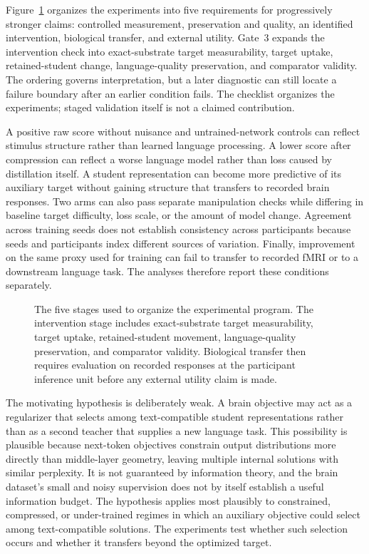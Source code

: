 Figure~\ref{fig:five-gates} organizes the experiments into five requirements for progressively stronger claims: controlled measurement, preservation and quality, an identified intervention, biological transfer, and external utility.
Gate~3 expands the intervention check into exact-substrate target measurability, target uptake, retained-student change, language-quality preservation, and comparator validity.
The ordering governs interpretation, but a later diagnostic can still locate a failure boundary after an earlier condition fails.
The checklist organizes the experiments; staged validation itself is not a claimed contribution.

A positive raw score without nuisance and untrained-network controls can reflect stimulus structure rather than learned language processing.
A lower score after compression can reflect a worse language model rather than loss caused by distillation itself.
A student representation can become more predictive of its auxiliary target without gaining structure that transfers to recorded brain responses.
Two arms can also pass separate manipulation checks while differing in baseline target difficulty, loss scale, or the amount of model change.
Agreement across training seeds does not establish consistency across participants because seeds and participants index different sources of variation.
Finally, improvement on the same proxy used for training can fail to transfer to recorded fMRI or to a downstream language task.
The analyses therefore report these conditions separately.

\enlargethispage{\baselineskip}
\begin{figure}[H]
  \centering
  
  \caption{The five stages used to organize the experimental program. The intervention stage includes exact-substrate target measurability, target uptake, retained-student movement, language-quality preservation, and comparator validity. Biological transfer then requires evaluation on recorded responses at the participant inference unit before any external utility claim is made.}
  \label{fig:five-gates}
\end{figure}

The motivating hypothesis is deliberately weak.
A brain objective may act as a regularizer that selects among text-compatible student representations rather than as a second teacher that supplies a new language task.
This possibility is plausible because next-token objectives constrain output distributions more directly than middle-layer geometry, leaving multiple internal solutions with similar perplexity.
It is not guaranteed by information theory, and the brain dataset's small and noisy supervision does not by itself establish a useful information budget.
The hypothesis applies most plausibly to constrained, compressed, or under-trained regimes in which an auxiliary objective could select among text-compatible solutions.
The experiments test whether such selection occurs and whether it transfers beyond the optimized target.

